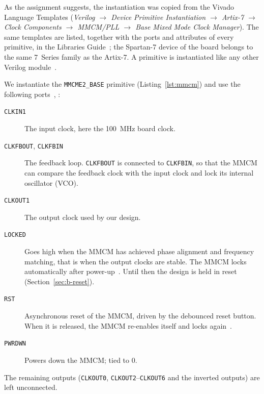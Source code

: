\documentclass{article}
\begin{document}
As the assignment suggests, the instantiation was copied from the Vivado
Language Templates (\emph{Verilog $\rightarrow$ Device Primitive Instantiation
$\rightarrow$ Artix-7 $\rightarrow$ Clock Components $\rightarrow$ MMCM/PLL
$\rightarrow$ Base Mixed Mode Clock Manager}). The same templates are listed,
together with the ports and attributes of every primitive, in the Libraries
Guide~\cite[Ch.~1: Introduction]{ug953}; the Spartan-7 device of the board belongs to the same
7~Series family as the Artix-7. A primitive is instantiated like any other
Verilog module~\cite[Instantiating Pre-Defined Primitives]{ug901}.



We instantiate the \texttt{MMCME2\_BASE} primitive (Listing~\ref{lst:mmcm}) and use the following
ports~\cite[Table~3-1: MMCME2\_BASE Ports]{ug472}, \cite[MMCME2\_BASE]{ug953}:
\begin{description}
  \item[\texttt{CLKIN1}] The input clock, here the \SI{100}{\mega\hertz} board clock.
  \item[\texttt{CLKFBOUT}, \texttt{CLKFBIN}] The feedback loop. \texttt{CLKFBOUT}
        is connected to \texttt{CLKFBIN}, so that the MMCM can compare the
        feedback clock with the input clock and lock its internal oscillator (VCO).
  \item[\texttt{CLKOUT1}] The output clock used by our design.
  \item[\texttt{LOCKED}] Goes high when the MMCM has achieved phase alignment
        and frequency matching, that is when the output clocks are stable. The
        MMCM locks automatically after power-up~\cite[MMCME2\_BASE]{ug953}. Until
        then the design is held in reset (Section~\ref{sec:b-reset}).
  \item[\texttt{RST}] Asynchronous reset of the MMCM, driven by the debounced
        reset button. When it is released, the MMCM re-enables itself and locks
        again~\cite[MMCME2\_BASE]{ug953}.
  \item[\texttt{PWRDWN}] Powers down the MMCM; tied to 0.
\end{description}
The remaining outputs (\texttt{CLKOUT0}, \texttt{CLKOUT2}--\texttt{CLKOUT6}
and the inverted outputs) are left unconnected.
\end{document}
